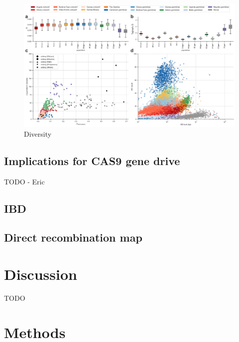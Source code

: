 \documentclass[a4paper,11pt,abstracton,hidelinks]{scrartcl}
\begin{document}
\begin{figure}[H]
	\begin{center}
		\includegraphics*[width=6.3in]{artwork/diversity_composite.jpeg}
	\end{center}
	\caption{Diversity}
	\label{pi}
\end{figure}


\subsection*{Implications for CAS9 gene drive}

TODO - Eric

\subsection*{IBD}


\subsection*{Direct recombination map}


\section*{Discussion}

TODO


\section*{Methods}
\end{document}

